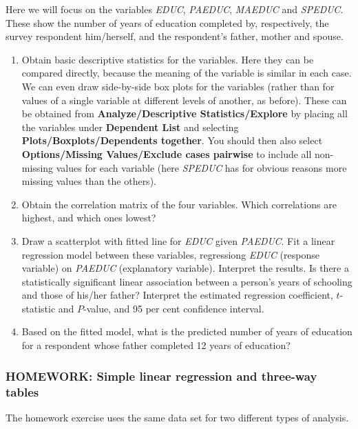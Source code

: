 Here we will focus on the variables
\emph{EDUC}, \emph{PAEDUC}, \emph{MAEDUC} and \emph{SPEDUC}. These
show the number of years of education completed by, respectively, the
survey respondent him/herself, and the respondent's father, mother and
spouse.
\begin{enumerate}

\item
Obtain basic descriptive statistics for the variables.
Here they can be compared directly, because the meaning of the variable
is similar in each case. We can even draw side-by-side box plots
for the variables (rather than for values of a single variable at
different levels of another, as before). These can be obtained from
\textbf{Analyze/Descriptive Statistics/Explore} by placing all the
variables under \textbf{Dependent List} and selecting
\textbf{Plots/Boxplots/Dependents together}. You should then also select
\textbf{Options/Missing Values/Exclude cases pairwise} to include all
non-missing values for each variable (here \emph{SPEDUC} has for obvious
reasons more missing values than the others).
\item
Obtain the correlation matrix of the four variables. Which
correlations are highest, and which ones lowest?
\item
Draw a scatterplot with fitted line
for \emph{EDUC} given \emph{PAEDUC}.
Fit a linear regression
model between these variables, regressiong \emph{EDUC} (response variable)
on \emph{PAEDUC} (explanatory variable).
Interpret the results. Is there a statistically significant linear association between
a person's years of schooling and those of his/her father? Interpret the estimated
regression coefficient, $t$-statistic and
$P$-value, and 95 per cent confidence interval.
\item
Based on
the fitted model, what is the predicted number of years of education for
a respondent whose father completed 12 years of education?
\end{enumerate}

\subsubsection{HOMEWORK: Simple linear regression and three-way tables}

The homework exercise uses the same data set for two different types of
analysis.

